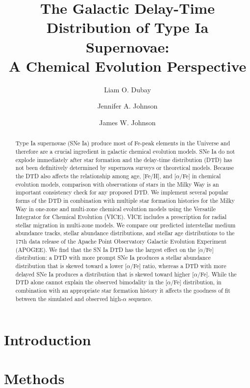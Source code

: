 \documentclass[twocolumn,linenumbers,twocolappendix]{aastex631}
\begin{document}
\title{The Galactic Delay-Time Distribution of Type Ia Supernovae:\\
    A Chemical Evolution Perspective}

\author[0000-0003-3781-0747]{Liam O. Dubay}
\author[0000-0001-7258-1834]{Jennifer A. Johnson}
\author[0000-0002-6534-8783]{James W. Johnson}

\begin{abstract}
    Type Ia supernovae (SNe Ia) produce most of Fe-peak elements in the Universe and therefore are a crucial ingredient in galactic chemical evolution models. SNe Ia do not explode immediately after star formation and the delay-time distribution (DTD) has not been definitively determined by supernova surveys or theoretical models. Because the DTD also affects the relationship among age, [Fe/H], and [$\alpha$/Fe] in chemical evolution models, comparison with observations of stars in the Milky Way is an important consistency check for any proposed DTD. We implement several popular forms of the DTD in combination with multiple star formation histories for the Milky Way in one-zone and multi-zone chemical evolution models using the Versatile Integrator for Chemical Evolution (VICE). VICE includes a prescription for radial stellar migration in multi-zone models. We compare our predicted interstellar medium abundance tracks, stellar abundance distributions, and stellar age distributions to the 17th data release of the Apache Point Observatory Galactic Evolution Experiment (APOGEE). We find that the SN Ia DTD has the largest effect on the [$\alpha$/Fe] distribution: a DTD with more prompt SNe Ia produces a stellar abundance distribution that is skewed toward a lower [$\alpha$/Fe] ratio, whereas a DTD with more delayed SNe Ia produces a distribution that is skewed toward higher [$\alpha$/Fe]. While the DTD alone cannot explain the observed bimodality in the [$\alpha$/Fe] distribution, in combination with an appropriate star formation history it affects the goodness of fit between the simulated and observed high-$\alpha$ sequence.
\end{abstract}

\section{Introduction}

\section{Methods}
\label{sec:methods}
\end{document}
